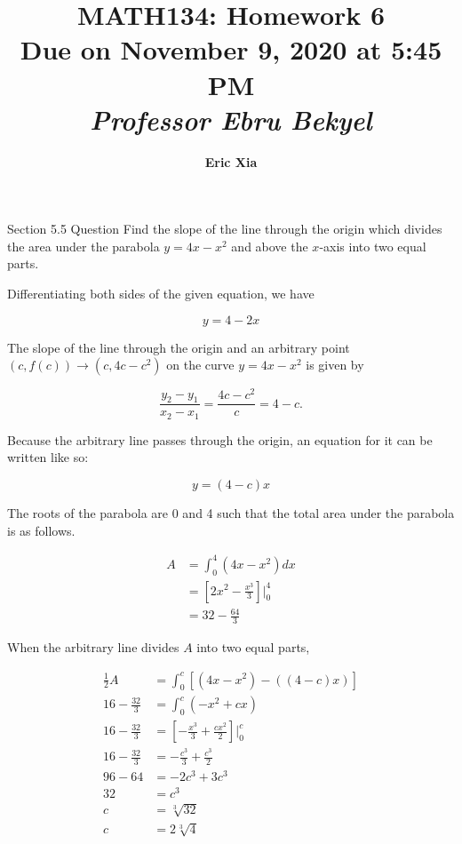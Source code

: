 \documentclass{article}
\title{
    \vspace{2in}
    \textmd{\textbf{MATH134: Homework 6}}\\
    \normalsize\vspace{0.1in}\small{Due on November 9, 2020 at 5:45 PM}\\
    \vspace{0.1in}\large{\textit{Professor Ebru Bekyel}}
    \vspace{3in}
}
\author{\textbf{Eric Xia}}
\date{}
\begin{document}
    \maketitle
    \pagebreak

    \thispagestyle{2}

    \begin{tbhtheorem}{Section 5.5 Question}
        Find the slope of the line through the origin which divides the area under the parabola $y=4x-x^2$ and above the $x$-axis into two equal parts.
    \end{tbhtheorem}

    Differentiating both sides of the given equation, we have

    \[
        y = 4 - 2x
    \]

    The slope of the line through the origin and an arbitrary point $(c,f(c))\rightarrow (c,4c-c^2)$ on the curve $y=4x-x^2$ is given by

    \[
        \frac{y_2 - y_1}{x_2 - x_1} = \frac{4c-c^2}{c} = 4-c.
    \]

    Because the arbitrary line passes through the origin, an equation for it can be written like so:

    \[
        y = (4-c)x
    \]

    The roots of the parabola are $0$ and 4 such that the total area under the parabola is as follows.

    \begin{align*}
        A   &= \int_0^4 (4x-x^2)dx \\
            &= \left[2x^2-\frac{x^3}{3}\right]\Big|_0^4 \\
            &= 32 - \frac{64}{3}
    \end{align*}

    When the arbitrary line divides $A$ into two equal parts,

    \begin{align*}
        \frac{1}{2}A        &= \int_0^c \left[\left(4x-x^2\right)-\left((4-c)x\right)\right] \\
        16 - \frac{32}{3}   &= \int_0^c \left(-x^2 + cx\right) \\
        16 - \frac{32}{3}   &= \left[-\frac{x^3}{3} + \frac{cx^2}{2}\right]\Big|_0^c \\
        16 - \frac{32}{3}   &= -\frac{c^3}{3} + \frac{c^3}{2} \\
        96 - 64             &= -2c^3 + 3c^3 \\
        32                  &= c^3 \\
        c                   &= \sqrt[3]{32} \\
        c                   &= 2\sqrt[3]{4}
    \end{align*}
\end{document}
